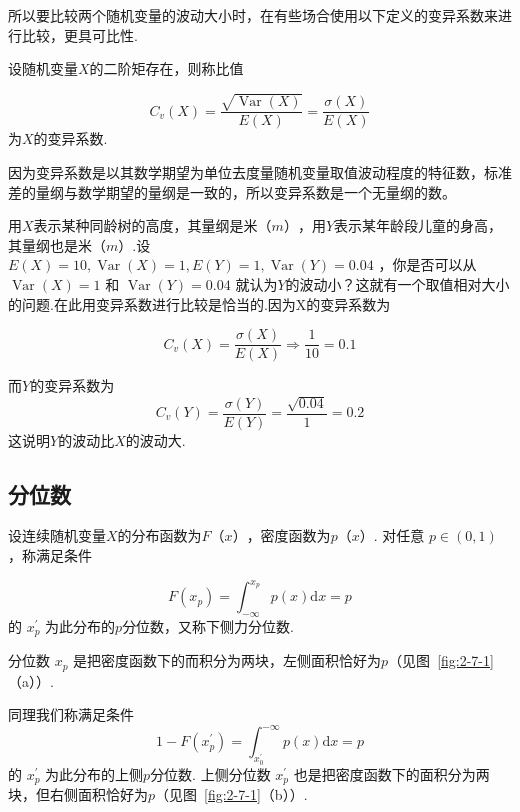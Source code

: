 所以要比较两个随机变量的波动大小时，在有些场合使用以下定义的变异系数来进行比较，更具可比性.

\begin{definition}
	设随机变量$ X $的二阶矩存在，则称比值
	
	\begin{equation}
	C_{v}(X)=\frac{\sqrt{\operatorname{Var}(X)}}{E(X)}=\frac{\sigma(X)}{E(X)} \label{eq:2.7.3}
	\end{equation}
	为$ X $的变异系数.
\end{definition}

因为变异系数是以其数学期望为单位去度量随机变量取值波动程度的特征数，标准差的量纲与数学期望的量纲是一致的，所以变异系数是一个无量纲的数。

\begin{example}
	用$ X $表示某种同龄树的高度，其量纲是米$ （m） $，用$ Y $表示某年龄段儿童的身高，其量纲也是米$ （m） $.设 $E(X)=10, \operatorname{Var}(X)=1, E(Y)=1, \operatorname{Var}(Y)=0.04 $ ，你是否可以从 $\operatorname{Var}(X)=1$  和 $\operatorname{Var}(Y)=0.04$ 就认为$ Y $的波动小？这就有一个取值相对大小的问题.在此用变异系数进行比较是恰当的.因为X的变异系数为
	
	\[
	C_{v}(X)=\frac{\sigma(X)}{E(X)} \Rightarrow \frac{1}{10}=0.1
	\]
	
	而$ Y $的变异系数为
	\[
	C_{v}(Y)=\frac{\sigma(Y)}{E(Y)}=\frac{\sqrt{0.04}}{1}=0.2
	\]
	这说明$ Y $的波动比$ X $的波动大.
\end{example}

\subsection{分位数}

\begin{definition}
	设连续随机变量$ X $的分布函数为$ F（x） $，密度函数为$ p（x） $.
	对任意 $p \in(0,1)$ ，称满足条件
	
	\begin{equation}
	F\left(x_{p}\right)=\int_{-\infty}^{x_{p}} p(x) \mathrm{d} x=p \label{eq:2.7.4}
	\end{equation}
	的 $x_{p}^{\prime}$ 为此分布的$ p $分位数，又称下侧力分位数.
	
	分位数 $x_{p}$ 是把密度函数下的而积分为两块，左侧面积恰好为$ p $（见图~\ref{fig:2-7-1}（a））.
	
	同理我们称满足条件
	\begin{equation}
	1-F\left(x_{p}^{\prime}\right)=\int_{x_{0}^{\prime}}^{-\infty} p(x) \mathrm{d} x=p \label{eq:2.7.5}
	\end{equation}
	的 $x_{p}^{\prime}$ 为此分布的上侧$ p $分位数.
	上侧分位数 $x_{p}^{\prime}$ 也是把密度函数下的面积分为两块，但右侧面积恰好为$ p $（见图~\ref{fig:2-7-1}（b））.
\end{definition}

